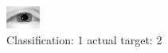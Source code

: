 \begin{figure}[h!]
\begin{center}
\includegraphics[width=0.60\columnwidth]{figures/ID2347_class_1_target_2.png}
\end{center}
\caption{ Classification: 1 actual target: 2}
\label{fig:ID2347_class_1_target_2}
\end{figure}
